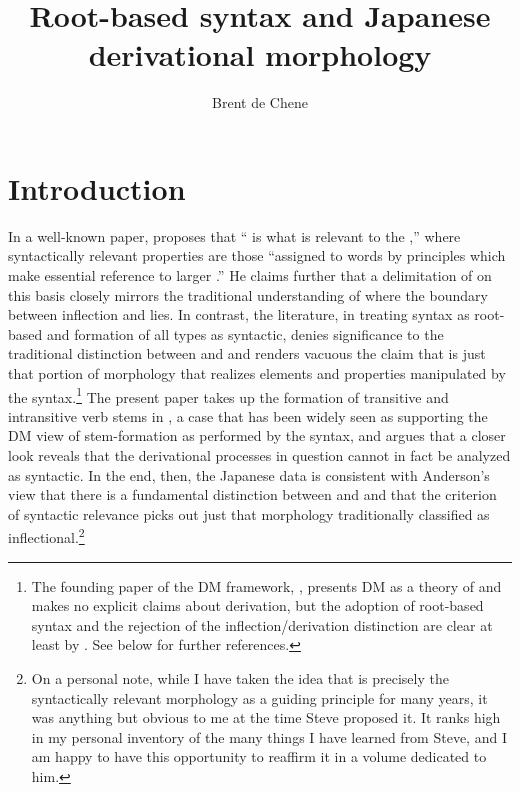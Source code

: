 \documentclass[output=paper,
modfonts
]{LSP/langsci}
\title{Root-based syntax and Japanese derivational morphology}
\author{%
Brent de Chene\affiliation{Waseda University}
}
\begin{document}
\maketitle

\section{Introduction}
\largerpage[-1]
In a well-known paper, \citet[587]{anderson1982a} proposes that `` is what is relevant to the ,'' where syntactically
relevant properties are those ``assigned to words by principles which
make essential reference to larger .'' He claims
further that a delimitation of  on this basis closely mirrors
the traditional understanding of where the boundary between inflection
and  lies. In contrast, the  literature,
in treating syntax as root-based and  formation of all types as
syntactic, denies significance to the traditional distinction between
 and  and renders vacuous the claim that 
is just that portion of morphology that realizes elements and properties
manipulated by the syntax.\footnote{The founding paper of the DM
  framework, \citet{halle1993a}, presents DM as a theory of
   and makes no explicit claims about derivation, but the
  adoption of root-based syntax and the rejection of the
  inflection/derivation distinction are clear at least by \citet{marantz1997a,marantz2001a}. See below for further references.} The present paper
takes up the formation of transitive and intransitive verb stems in
, a case that has been widely seen as supporting the DM view of
stem-formation as performed by the syntax, and argues that a closer look
reveals that the derivational processes in question cannot in fact be
analyzed as syntactic. In the end, then, the Japanese data is consistent
with Anderson's view that there is a fundamental distinction between
 and  and that the criterion of syntactic relevance
picks out just that morphology traditionally classified as
inflectional.\footnote{On a personal note, while I have taken the idea
  that  is precisely the syntactically relevant morphology as
  a guiding principle for many years, it was anything but obvious to me
  at the time Steve proposed it. It ranks high in my personal inventory
  of the many things I have learned from Steve, and I am happy to have
  this opportunity to reaffirm it in a volume dedicated to him.}
\end{document}
